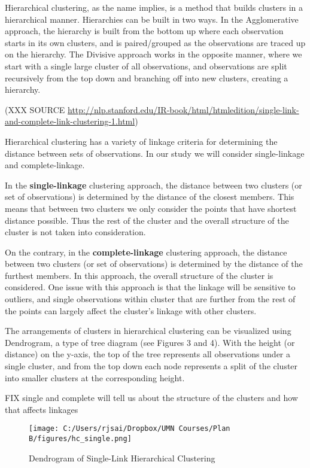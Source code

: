 \documentclass[]{article}
\begin{document}
Hierarchical clustering, as the name implies, is a method that builds
clusters in a hierarchical manner. Hierarchies can be built in two ways.
In the Agglomerative approach, the hierarchy is built from the bottom up
where each observation starts in its own clusters, and is paired/grouped
as the observations are traced up on the hierarchy. The Divisive
approach works in the opposite manner, where we start with a single
large cluster of all observations, and observations are split
recursively from the top down and branching off into new clusters,
creating a hierarchy.

(XXX SOURCE
\url{http://nlp.stanford.edu/IR-book/html/htmledition/single-link-and-complete-link-clustering-1.html})

Hierarchical clustering has a variety of linkage criteria for
determining the distance between sets of observations. In our study we
will consider single-linkage and complete-linkage.

In the \textbf{single-linkage} clustering approach, the distance between
two clusters (or set of observations) is determined by the distance of
the closest members. This means that between two clusters we only
consider the points that have shortest distance possible. Thus the rest
of the cluster and the overall structure of the cluster is not taken
into consideration.

On the contrary, in the \textbf{complete-linkage} clustering approach,
the distance between two clusters (or set of observations) is determined
by the distance of the furthest members. In this approach, the overall
structure of the cluster is considered. One issue with this approach is
that the linkage will be sensitive to outliers, and single observations
within cluster that are further from the rest of the points can largely
affect the cluster's linkage with other clusters.

The arrangements of clusters in hierarchical clustering can be
visualized using Dendrogram, a type of tree diagram (see Figures 3 and
4). With the height (or distance) on the y-axis, the top of the tree
represents all observations under a single cluster, and from the top
down each node represents a split of the cluster into smaller clusters
at the corresponding height.

FIX single and complete will tell us about the structure of the clusters
and how that affects linkages

\begin{figure}
\centering
\texttt{[image: C:/Users/rjsai/Dropbox/UMN Courses/Plan B/figures/hc\_single.png]}
\caption{Dendrogram of Single-Link Hierarchical Clustering}
\end{figure}
\end{document}
